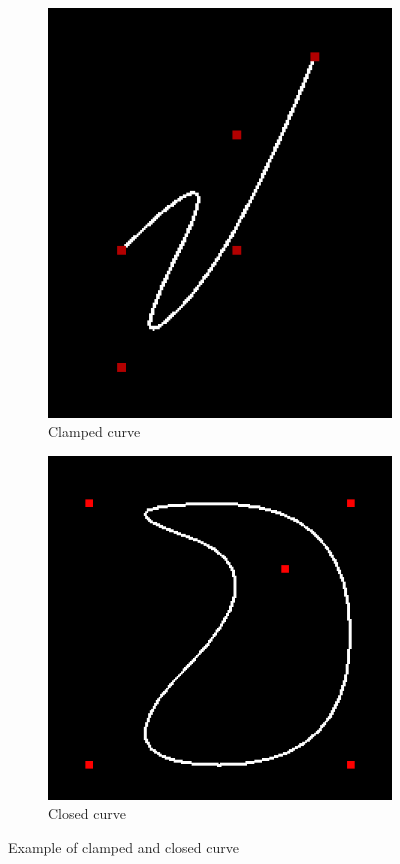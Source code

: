 \documentclass{article}
\begin{document}
\begin{figure}
    \centering
    \begin{subfigure}[b]{0.4\textwidth}
        \includegraphics[width=\textwidth,height = \textwidth]{cl}
        \caption{Clamped curve}
        \label{fig:clamped}
    \end{subfigure}
    \begin{subfigure}[b]{0.4\textwidth}
        \includegraphics[width=\textwidth]{closed}
        \caption{Closed curve}
        \label{fig:closed}
    \end{subfigure}
    \caption{Example of clamped and closed curve}\label{fig:curve}
\end{figure}
\end{document}
